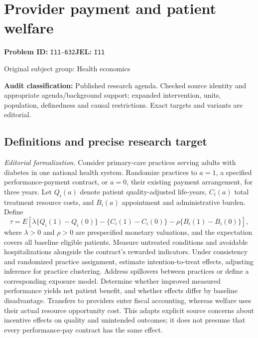 \documentclass[11pt,a4paper]{article}
\begin{document}
\section*{Provider payment and patient welfare}
\textbf{Problem ID:} \texttt{I11-632}\quad \textbf{JEL:} \texttt{I11}\par
\label{problem:OP-0443}
{\sffamily\small\color{muted}Original subject group: Health economics\par}
\label{definitions:problem:30007725}
\textbf{Audit classification:} Published research agenda. Checked source identity and appropriate agenda/background support; expanded intervention, units, population, definedness and causal restrictions. Exact targets and variants are editorial.
\subsection*{Definitions and precise research target}
\textit{Editorial formalization.} Consider primary-care practices serving adults with diabetes in one national health system. Randomize practices to \(a=1\), a specified performance-payment contract, or \(a=0\), their existing payment arrangement, for three years. Let \(Q_i(a)\) denote patient quality-adjusted life-years, \(C_i(a)\) total treatment resource costs, and \(B_i(a)\) appointment and administrative burden. Define
\[\tau=E[\lambda\{Q_i(1)-Q_i(0)\}-\{C_i(1)-C_i(0)\}-\rho\{B_i(1)-B_i(0)\}],\]
where \(\lambda>0\) and \(\rho>0\) are prespecified monetary valuations, and the expectation covers all baseline eligible patients. Measure untreated conditions and avoidable hospitalizations alongside the contract’s rewarded indicators. Under consistency and randomized practice assignment, estimate intention-to-treat effects, adjusting inference for practice clustering. Address spillovers between practices or define a corresponding exposure model. Determine whether improved measured performance yields net patient benefit, and whether effects differ by baseline disadvantage. Transfers to providers enter fiscal accounting, whereas welfare uses their actual resource opportunity cost. This adapts explicit source concerns about incentive effects on quality and unintended outcomes; it does not presume that every performance-pay contract has the same effect.
\end{document}
